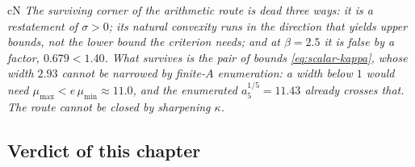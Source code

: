 \begin{claimbox}{cN}
 \emph{The surviving corner of the arithmetic route is
dead three ways: it is a restatement of $\sigma>0$; its natural convexity runs in the direction
that yields upper bounds, not the lower bound the criterion needs; and at $\beta=2.5$ it is false
by a factor, $0.679<1.40$. What survives is the pair of bounds
\eqref{eq:scalar-kappa}, whose width $2.93$ cannot be narrowed by finite-$A$ enumeration: a width
below $1$ would need $\mu_{\max}<e\,\mu_{\min}\approx11.0$, and the enumerated
$a_5^{1/5}=11.43$ already crosses that. The route cannot be closed by sharpening $\kappa$.}
\LN{}
\end{claimbox}


\subsection{Verdict of this chapter}
\label{sec:scalar-verdict}

